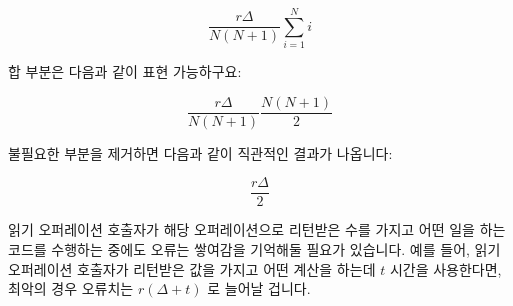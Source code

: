 \begin{enumerate}
	\begin{equation}
		\frac{r \Delta}{N \left( N + 1 \right)}
			\sum_{i = 1}^N i
	\end{equation}

	합 부분은 다음과 같이 표현 가능하구요:

	\begin{equation}
		\frac{r \Delta}{N \left( N + 1 \right)}
			\frac{N \left( N + 1 \right)}{2}
	\end{equation}

	불필요한 부분을 제거하면 다음과 같이 직관적인 결과가 나옵니다:

	\begin{equation}
		\frac{r \Delta}{2}
	\label{eq:count:CounterErrorAverage}
	\end{equation}

	읽기 오퍼레이션 호출자가 해당 오퍼레이션으로 리턴받은 수를 가지고 어떤
	일을 하는 코드를 수행하는 중에도 오류는 쌓여감을 기억해둘 필요가
	있습니다.
	예를 들어, 읽기 오퍼레이션 호출자가 리턴받은 값을 가지고 어떤 계산을
	하는데 $t$ 시간을 사용한다면, 최악의 경우 오류치는 $r \left(\Delta +
	t\right)$ 로 늘어날 겁니다.


\end{enumerate}
